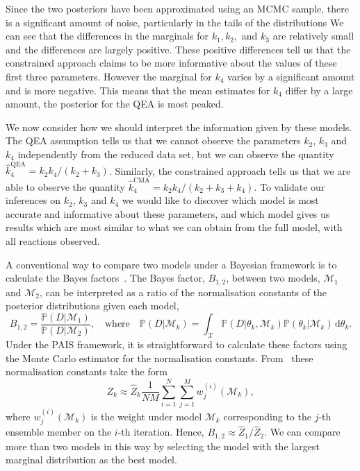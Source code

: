 \documentclass[final]{siamltex}
\begin{document}
Since the two posteriors have been approximated using an MCMC sample, there is a significant amount of noise, particularly in the tails of the distributions We can see that the differences in the marginals for $k_1, k_2,$ and $k_3$ are relatively small and the differences are largely positive. These positive differences tell us that the constrained approach claims to be more informative about the values of these first three parameters. However the marginal for $k_4$ varies by a significant amount and is more negative. This means that the mean estimates for $k_4$ differ by a large amount, the posterior for the QEA is most peaked.

We now consider how we should interpret the information given by these models. The QEA assumption tells us that we cannot observe the parameters $k_2$, $k_3$ and $k_4$ independently from the reduced data set, but we can observe the quantity $\hat{k}_4^{\text{QEA}} = k_2k_4/(k_2+k_3)$. Similarly, the constrained approach tells us that we are able to observe the quantity $\hat{k}_4^{\text{CMA}} = k_2k_4/(k_2+k_3+k_4)$. To validate our inferences on $k_2$, $k_3$ and $k_4$ we would like to discover which model is most accurate and informative about these parameters, and which model gives us results which are most similar to what we can obtain from the full model, with all reactions observed.

A conventional way to compare two models under a Bayesian framework is to calculate the Bayes factors~\cite{chen2012monte}. The Bayes factor, $B_{1,2}$, between two models, $\mathcal{M}_1$ and $\mathcal{M}_2$, can be interpreted as a ratio of the normalisation constants of the posterior distributions given each model,
\[
	B_{1,2} = \frac{\mathbb{P}(D|\mathcal{M}_1)}{\mathbb{P}(D|\mathcal{M}_2)}, \quad \text{where} \quad \mathbb{P}(D|\mathcal{M}_k) = \int_\mathcal{X} \mathbb{P}(D|\theta_k,\mathcal{M}_k)\mathbb{P}(\theta_k|\mathcal{M}_k) \, \text{d}\theta_k.
\]
Under the PAIS framework, it is straightforward to calculate these factors using the Monte Carlo estimator for the normalisation constants. From~\cite{robert2013monte} these normalisation constants take the form
\[
	Z_k \approx \hat{Z}_k\frac{1}{NM}\sum_{i=1}^N\sum_{j=1}^M w_j^{(i)}(\mathcal{M}_k),
\]
where $w_j^{(i)}(\mathcal{M}_k)$ is the weight under model $\mathcal{M}_k$ corresponding to the $j$-th ensemble member on the $i$-th iteration. Hence, $B_{1,2} \approx \hat{Z}_1/\hat{Z}_2$. We can compare more than two models in this way by selecting the model with the largest marginal distribution as the best model.
\end{document}
